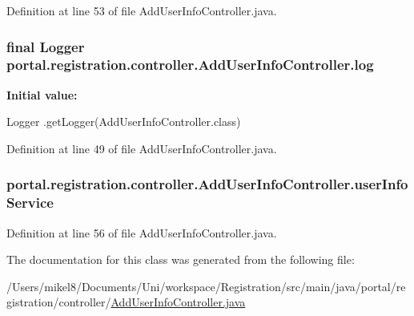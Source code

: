Definition at line 53 of file AddUserInfoController.java.

\hypertarget{classportal_1_1registration_1_1controller_1_1AddUserInfoController_af927058bc53f731960f2e6f060a1a2f2}{
\subsubsection[{log}]{\setlength{\rightskip}{0pt plus 5cm}final Logger {\bf portal.registration.controller.AddUserInfoController.log}}}
\label{classportal_1_1registration_1_1controller_1_1AddUserInfoController_af927058bc53f731960f2e6f060a1a2f2}
{\bfseries Initial value:}
\begin{DoxyCode}
 Logger
                        .getLogger(AddUserInfoController.class)
\end{DoxyCode}


Definition at line 49 of file AddUserInfoController.java.

\hypertarget{classportal_1_1registration_1_1controller_1_1AddUserInfoController_a1a21bbb7663d92f2485157535a250956}{
\subsubsection[{userInfoService}]{ {\bf portal.registration.controller.AddUserInfoController.userInfoService}}}
\label{classportal_1_1registration_1_1controller_1_1AddUserInfoController_a1a21bbb7663d92f2485157535a250956}


Definition at line 56 of file AddUserInfoController.java.



The documentation for this class was generated from the following file:\begin{DoxyCompactItemize}
\item 
/Users/mikel8/Documents/Uni/workspace/Registration/src/main/java/portal/registration/controller/\hyperlink{AddUserInfoController_8java}{AddUserInfoController.java}\end{DoxyCompactItemize}
